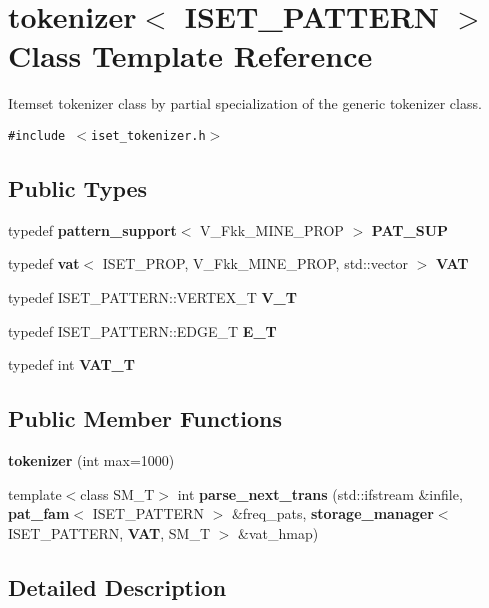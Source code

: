 \section{tokenizer$<$ ISET\_\-PATTERN $>$ Class Template Reference}
\label{classtokenizer_3_01ISET__PATTERN_01_4}
Itemset tokenizer class by partial specialization of the generic tokenizer class.  


{\tt \#include $<$iset\_\-tokenizer.h$>$}

\subsection*{Public Types}
\begin{CompactItemize}
\item 
typedef {\bf pattern\_\-support}$<$ V\_\-Fkk\_\-MINE\_\-PROP $>$ {\bf PAT\_\-SUP}\label{classtokenizer_3_01ISET__PATTERN_01_4_w0}

\item 
typedef {\bf vat}$<$ ISET\_\-PROP, V\_\-Fkk\_\-MINE\_\-PROP, std::vector $>$ {\bf VAT}\label{classtokenizer_3_01ISET__PATTERN_01_4_w1}

\item 
typedef ISET\_\-PATTERN::VERTEX\_\-T {\bf V\_\-T}\label{classtokenizer_3_01ISET__PATTERN_01_4_w2}

\item 
typedef ISET\_\-PATTERN::EDGE\_\-T {\bf E\_\-T}\label{classtokenizer_3_01ISET__PATTERN_01_4_w3}

\item 
typedef int {\bf VAT\_\-T}
\end{CompactItemize}
\subsection*{Public Member Functions}
\begin{CompactItemize}
\item 
{\bf tokenizer} (int max=1000)
\item 
template$<$class SM\_\-T$>$ int {\bf parse\_\-next\_\-trans} (std::ifstream \&infile, {\bf pat\_\-fam}$<$ ISET\_\-PATTERN $>$ \&freq\_\-pats, {\bf storage\_\-manager}$<$ ISET\_\-PATTERN, {\bf VAT}, SM\_\-T $>$ \&vat\_\-hmap)
\end{CompactItemize}


\subsection{Detailed Description}
